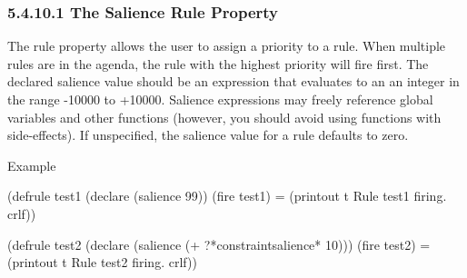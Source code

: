\documentclass[letterpaper,10pt,english]{sphinxmanual}
\begin{document}
\begin{sphinxVerbatim}[commandchars=\\\{\}]
   

    
                     

    
\end{sphinxVerbatim}


\subsubsection{5.4.10.1 The Salience Rule Property}
\label{\detokenize{defrule:the-salience-rule-property}}
The  rule property allows the user to assign a priority to a
rule. When multiple rules are in the agenda, the rule with the highest
priority will fire first. The declared salience value should be an
expression that evaluates to an an integer in the range -10000 to
+10000. Salience expressions may freely reference global variables and
other functions (however, you should avoid using functions with
side-effects). If unspecified, the salience value for a rule defaults to
zero.

Example

\begin{sphinxVerbatim}[commandchars=\\\{\}]
(defrule test\PYGZhy{}1
  (declare (salience 99))
 (fire test\PYGZhy{}1)
 =\PYGZgt{}
 (printout t \PYGZdq{}Rule test\PYGZhy{}1 firing.\PYGZdq{} crlf))

(defrule test\PYGZhy{}2
  (declare (salience (+ ?*constraint\PYGZhy{}salience\PYGZbs{}* 10)))
  (fire test\PYGZhy{}2)
      =\PYGZgt{}
  (printout t \PYGZdq{}Rule test\PYGZhy{}2 firing.\PYGZdq{} crlf))
\end{sphinxVerbatim}
\end{document}
